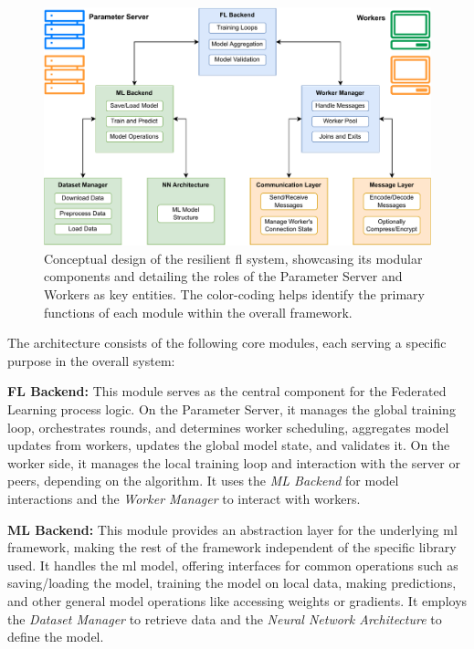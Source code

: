 \begin{figure}[!htb]
    \centering
    \includegraphics[width=\textwidth]{figs/modules.pdf}
    \caption[Proposed FL Framework Architecture]{Conceptual design of the resilient \ac{fl} system, showcasing its modular components and detailing the roles of the Parameter Server and Workers as key entities. The color-coding helps identify the primary functions of each module within the overall framework.}
    \label{fig:architecture}
\end{figure}

The architecture consists of the following core modules, each serving a specific purpose in the overall system:

\textbf{FL Backend:} This module serves as the central component for the Federated Learning process logic. On the Parameter Server, it manages the global training loop, orchestrates rounds, and determines worker scheduling, aggregates model updates from workers, updates the global model state, and validates it. On the worker side, it manages the local training loop and interaction with the server or peers, depending on the algorithm. It uses the \textit{ML Backend} for model interactions and the \textit{Worker Manager} to interact with workers.

\textbf{ML Backend:} This module provides an abstraction layer for the underlying \ac{ml} framework, making the rest of the framework independent of the specific library used. It handles the \ac{ml} model, offering interfaces for common operations such as saving/loading the model, training the model on local data, making predictions, and other general model operations like accessing weights or gradients. It employs the \textit{Dataset Manager} to retrieve data and the \textit{Neural Network Architecture} to define the model.

